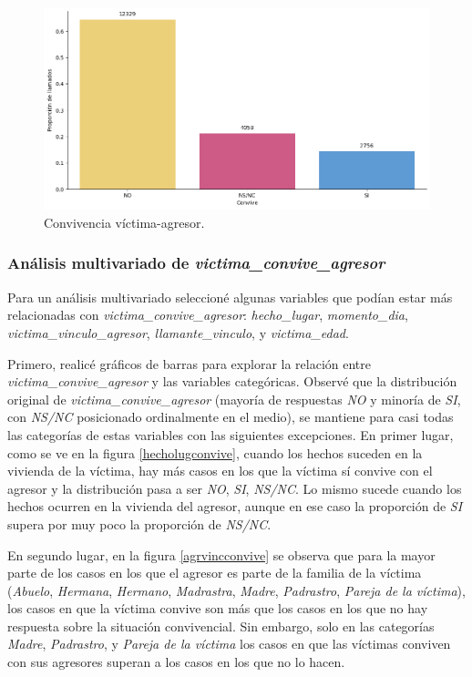 \documentclass[10 pt]{article}
\begin{document}
\begin{figure}[H]
    \begin{center}
    \includegraphics[scale=.5]{images/latex_convive.png}
    \caption{Convivencia víctima-agresor.}
    \label{convivencia}
    \end{center}
    \end{figure}


\subsubsection{Análisis multivariado de \textit{victima\_convive\_agresor}}\label{faltantes}


Para un análisis multivariado seleccioné algunas variables que podían estar más relacionadas con \textit{victima\_convive\_agresor}: 
\textit{hecho\_lugar}, \textit{momento\_dia}, \textit{victima\_vinculo\_agresor}, \textit{llamante\_vinculo}, y \textit{victima\_edad}. 

Primero, realicé gráficos de barras para explorar la relación entre \textit{victima\_convive\_agresor} y las variables categóricas.
Observé que la distribución original de \textit{victima\_convive\_agresor} (mayoría de respuestas \textit{NO} y minoría de \textit{SI}, con \textit{NS/NC} posicionado ordinalmente en el medio), se mantiene para casi todas las categorías de estas variables con las siguientes excepciones. En primer lugar, como se ve en la figura \ref{hecholugconvive}, cuando los hechos suceden en la vivienda de la víctima, hay más casos en los que la víctima sí convive con el agresor y la distribución pasa a ser \textit{NO}, \textit{SI}, \textit{NS/NC}. Lo mismo sucede cuando los hechos ocurren en la vivienda del agresor, aunque en ese caso la proporción de \textit{SI} supera por muy poco la proporción de \textit{NS/NC}. 

En segundo lugar, en la figura \ref{agrvincconvive} se observa que para la mayor parte de los casos en los que el agresor es parte de la familia de la víctima (\textit{Abuelo}, \textit{Hermana}, \textit{Hermano}, \textit{Madrastra}, \textit{Madre}, \textit{Padrastro}, \textit{Pareja de la víctima}), los casos en que la víctima convive son más que los casos en los que no hay respuesta sobre la situación convivencial. Sin embargo, solo en las categorías \textit{Madre}, \textit{Padrastro}, y \textit{Pareja de la víctima} los casos en que las víctimas conviven con sus agresores superan a los casos en los que no lo hacen.
\end{document}
